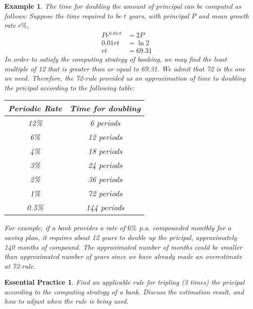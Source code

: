 \documentclass[12pt]{article}
\newtheorem*{example}{Example}
\newtheorem{exercise}{Essential Practice}[section]
\begin{document}
    \begin{example}
        The time for doubling the amount of principal can be computed as follows: Suppose the time required to be $t$ years, with principal $P$ and mean growth rate $r\%$,\begin{align*}
            Pe^{0.01rt}&=2P\\
            0.01rt&=\ln{2}\\
            rt&=69.31
        \end{align*}
        In order to satisfy the computing strategy of banking, we may find the least multiple of 12 that is greater than or equal to 69.31. We admit that 72 is the one we need. Therefore, the 72-rule provided us an approximation of time to doubling the pricipal according to the following table:
        \begin{center}
            \begin{tabular}{|c|c|}
                \hline
                Periodic Rate&Time for doubling\\
                \hline
                12\% &6 periods\\
                \hline
                6\% &12 periods\\
                \hline
                4\% &18 periods\\
                \hline
                3\% &24 periods\\
                \hline
                2\% &36 periods\\
                \hline
                1\% &72 periods\\
                \hline
                0.5\% &144 periods\\
                \hline
            \end{tabular}
        \end{center}

        For example, if a bank provides a rate of $6\%$ p.a. compounded monthly for a saving plan, it requires about 12 years to double up the pricipal, approximately 140 months of compound. The approximated number of months could be smaller than approximated number of years since we have already made an overestimate at 72-rule.
    \end{example}

    \begin{exercise}
        Find an applicable rule for tripling (3 times) the pricipal according to the computing strategy of a bank. Discuss the estimation result, and how to adjust when the rule is being used.
    \end{exercise}
\end{document}
